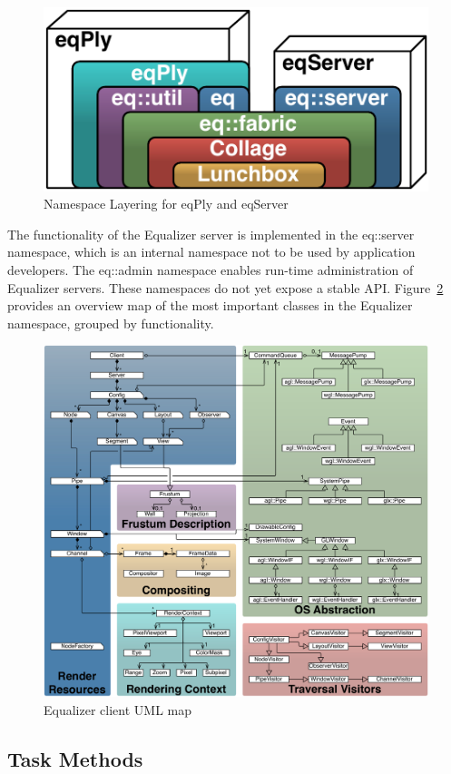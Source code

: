 \documentclass[10pt,a4]{scrartcl}
\newcommand{\fig}[1]{Figure~\ref{#1}}
\begin{document}
\begin{figure}
  \includegraphics[width=.382\textwidth]{images/namespaces}
  {\caption{\label{fNamespaces}Namespace Layering for eqPly and eqServer}}
\end{figure}
The functionality of the Equalizer server is implemented in the
\textsf{eq::server} namespace, which is an internal namespace not to be used by
application developers. The \textsf{eq::admin} namespace enables run-time
administration of Equalizer servers. These namespaces do not yet expose a stable
API. \fig{fClientUml} provides an overview map of the most important classes in
the Equalizer namespace, grouped by functionality.

\begin{figure}[ht!]\center
  \includegraphics[width=\textwidth]{images/clientUML}
  {\caption{\label{fClientUml}Equalizer client UML map}}
\end{figure}

\subsection{\label{sTaskMethods}Task Methods}
\end{document}
